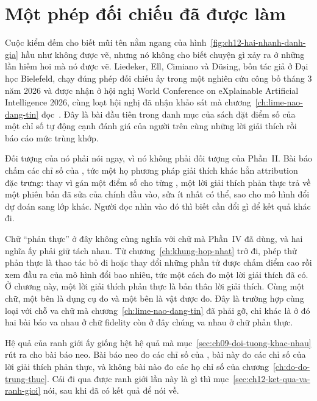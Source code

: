 \section{Một phép đối chiếu đã được làm}
\label{sec:ch12-mot-phep-doi-chieu}

%
Cuộc kiểm đếm cho biết mũi tên nằm ngang của
hình~\ref{fig:ch12-hai-nhanh-danh-gia} hầu như không được vẽ, nhưng nó không
cho biết chuyện gì xảy ra ở những lần hiếm hoi mà nó được vẽ. Liedeker, Ell,
Cimiano và Düsing, bốn tác giả ở Đại học Bielefeld, chạy đúng phép đối chiếu
ấy trong một nghiên cứu công bố tháng 3 năm 2026 và được nhận ở
hội nghị World Conference on eXplainable Artificial Intelligence 2026, cùng
loạt hội nghị đã nhận khảo sát mà chương~\ref{ch:lime-nao-dang-tin}
đọc~\autocite{p25userperception}. Đây là bài đầu tiên trong danh mục của sách
đặt điểm số của một chỉ số tự động cạnh đánh giá của người trên cùng những lời
giải thích rồi báo cáo mức trùng khớp.

%
Đối tượng của nó phải nói ngay, vì nó không phải đối tượng của Phần~II. Bài
báo chấm các chỉ số của , tức một họ phương pháp giải thích khác hẳn attribution đặc trưng:
thay vì gán một điểm số cho từng , một lời giải thích phản thực trả
về một phiên bản đã sửa của chính đầu vào, sửa ít nhất có thể, sao cho mô hình
đổi dự đoán sang lớp khác. Người đọc nhìn vào đó thì biết cần đổi gì để kết
quả khác đi.

Chữ \enquote{phản thực} ở đây không cùng nghĩa với chữ  mà Phần~IV đã
dùng, và hai nghĩa ấy phải giữ tách nhau. Từ chương~\ref{ch:khung-hop-nhat}
trở đi, phép thử phản thực là thao tác bỏ đi hoặc thay đổi những phần tử được
chấm điểm cao rồi xem đầu ra của mô hình đổi bao nhiêu, tức một cách đo một
lời giải thích đã có. Ở chương này, một lời giải thích phản thực là bản thân
lời giải thích. Cùng một chữ, một bên là dụng cụ đo và một bên là vật được đo.
Đây là trường hợp cùng loại với chỗ va chữ mà
chương~\ref{ch:lime-nao-dang-tin} đã phải gỡ, chỉ khác là ở đó hai bài báo va
nhau ở chữ fidelity còn ở đây chúng va nhau ở chữ phản thực.

Hệ quả của ranh giới ấy giống hệt hệ quả mà
mục~\ref{sec:ch09-doi-tuong-khac-nhau} rút ra cho bài báo neo. Bài báo neo đo
các chỉ số của , bài này đo các chỉ số của lời giải thích phản
thực, và không bài nào đo các họ chỉ số của
chương~\ref{ch:do-do-trung-thuc}. Cái đi qua được ranh giới lần này là gì thì
mục~\ref{sec:ch12-ket-qua-va-ranh-gioi} nói, sau khi đã có kết quả để nói về.

